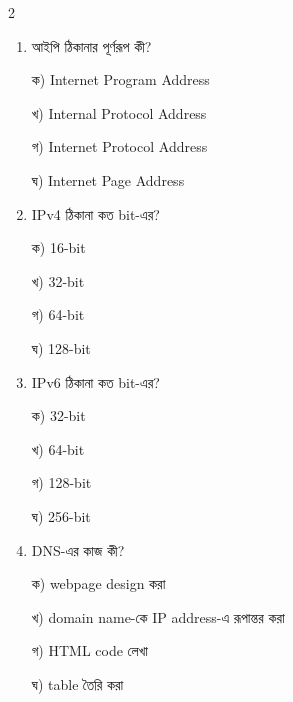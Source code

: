\begin{multicols}{2}
\begin{enumerate}[leftmargin=*,itemsep=4pt]
\item \begin{minipage}[t]{\linewidth}\vspace{0pt}
আইপি ঠিকানার পূর্ণরূপ কী?
\par ক) Internet Program Address
\par খ) Internal Protocol Address
\par গ) Internet Protocol Address
\par ঘ) Internet Page Address\\
\end{minipage}

\item \begin{minipage}[t]{\linewidth}\vspace{0pt}
IPv4 ঠিকানা কত bit-এর?
\par ক) 16-bit
\par খ) 32-bit
\par গ) 64-bit
\par ঘ) 128-bit\\
\end{minipage}

\item \begin{minipage}[t]{\linewidth}\vspace{0pt}
IPv6 ঠিকানা কত bit-এর?
\par ক) 32-bit
\par খ) 64-bit
\par গ) 128-bit
\par ঘ) 256-bit\\
\end{minipage}

\item \begin{minipage}[t]{\linewidth}\vspace{0pt}
DNS-এর কাজ কী?
\par ক) webpage design করা
\par খ) domain name-কে IP address-এ রূপান্তর করা
\par গ) HTML code লেখা
\par ঘ) table তৈরি করা\\
\end{minipage}


\end{enumerate}
\end{multicols}
